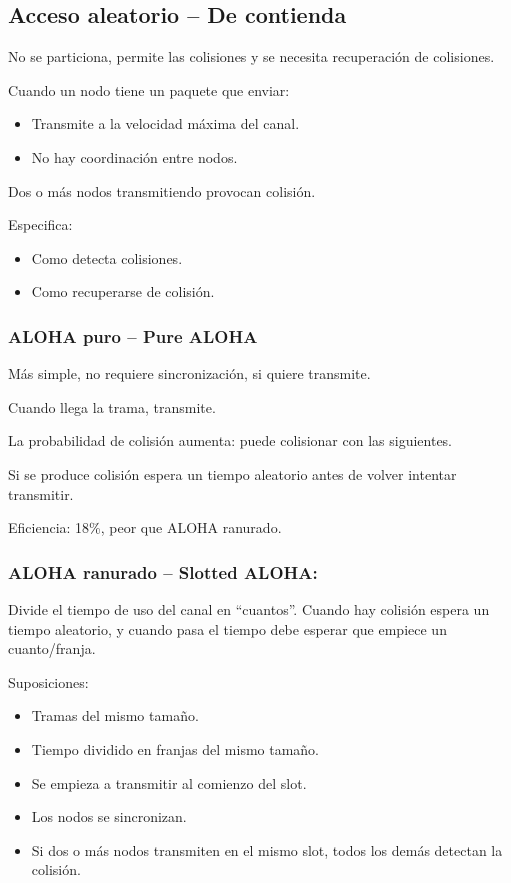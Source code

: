 \documentclass[12pt, twoside, openright]{report} %
\begin{document}
\subsection{Acceso aleatorio -- De contienda}
No se particiona, permite las
colisiones y se necesita recuperación de colisiones.


Cuando un nodo tiene un paquete que enviar:

\begin{itemize}
	\item Transmite a la velocidad máxima del canal.
	\item No hay coordinación entre nodos.
\end{itemize}

Dos o más nodos transmitiendo provocan colisión.

Especifica:

\begin{itemize}
	\item Como detecta colisiones.
	\item Como recuperarse de colisión.
\end{itemize}
\subsubsection{ALOHA puro -- Pure ALOHA}


Más simple, no requiere sincronización, si quiere transmite.

Cuando llega la trama, transmite.

La probabilidad de colisión aumenta: puede colisionar con las
siguientes.

Si se produce colisión espera un tiempo aleatorio antes de
volver intentar transmitir.

Eficiencia: 18\%, peor que ALOHA ranurado.

\subsubsection{ALOHA ranurado -- Slotted ALOHA:}



Divide el tiempo de uso del canal en \enquote{cuantos}. Cuando hay
colisión espera un tiempo aleatorio, y cuando pasa el tiempo
debe esperar que empiece un cuanto/franja.

Suposiciones:

\begin{itemize}
	\item Tramas del mismo tamaño.
	\item Tiempo dividido en franjas del mismo tamaño.
	\item Se empieza a transmitir al comienzo del slot.
	\item Los nodos se sincronizan.
	\item Si dos o más nodos transmiten en el mismo slot, todos los
	      demás detectan la colisión.
\end{itemize}
\end{document}
